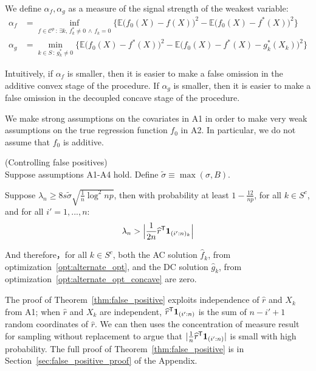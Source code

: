 We define $\alpha_f, \alpha_g$ as a measure of the signal strength of the weakest variable:
\begin{align*}
\alpha_f &= \inf_{f \in \mathcal{C}^p \,:\, \exists k ,\, f^*_k \neq 0 \,\wedge\, f_k = 0} 
       \Big\{ \mathbb{E} \big( f_0(X) - f(X) \big)^2 - 
        \mathbb{E} \big( f_0(X) - f^*(X) \big)^2  \Big\}\\
\alpha_g &=   \min_{k \in S \,:\, g^*_k \neq 0}
      \Big\{ \mathbb{E} \big( f_0(X) - f^*(X) \big)^2 - 
    \mathbb{E} \big( f_0(X) - f^*(X) - g^*_k(X_k) \big)^2 \Big\}
\end{align*}

Intuitively, if $\alpha_f$ is smaller, then it is easier to make a false omission in the additive convex stage of the procedure. If $\alpha_g$ is smaller, then it is easier to make a false omission in the decoupled concave stage of the procedure.

\begin{remark}
  We make strong assumptions on the covariates in A1 in order to make
  very weak assumptions on the true regression function $f_0$ in
  A2. In particular, we do not assume that $f_0$ is additive. 
\end{remark}


\begin{theorem} (Controlling false positives) \\
\label{thm:false_positive}
Suppose assumptions A1-A4 hold. Define $\tilde{\sigma} \equiv \max(\sigma, B)$.

Suppose $\lambda_n \geq 8 s \tilde{\sigma}  \sqrt{ \frac{1}{n} \log^2 np}$, then with probability at least $ 1 - \frac{12}{np}$, for all $k \in S^c$, and for all $i'=1,...,n$:
\[
\lambda_n > \Big| \frac{1}{2n}\widehat{r}^{\mathsf{T}} \mbox{\boldmath $1$}_{(i':n)_k} \Big|
\]

And therefore，for all $k \in S^c$, both the AC solution $\hat{f}_k$, from optimization~\ref{opt:alternate_opt}, and the DC solution $\hat{g}_k$, from optimization~\ref{opt:alternate_opt_concave} are zero. \\
\end{theorem}

The proof of Theorem~\ref{thm:false_positive} exploits independence of
$\hat{r}$ and $X_k$ from A1; when $\hat{r}$ and $X_k$ are independent, $\widehat{r}^{\mathsf{T}} \mbox{\boldmath $1$}_{(i':n)}$ is the sum of $n - i' +1$ random coordinates of $\hat{r}$.  We can then uses the concentration of measure result for sampling without replacement to argue that $| \frac{1}{n} \widehat{r}^{\mathsf{T}}\mbox{\boldmath $1$}_{(i':n)}|$ is small with high probability. The full proof of
Theorem~\ref{thm:false_positive} is in
Section~\ref{sec:false_positive_proof} of the Appendix.

